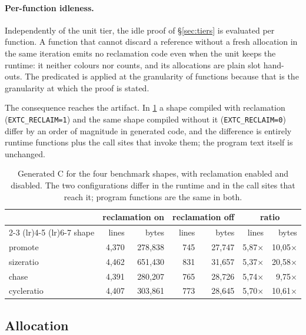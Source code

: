 \paragraph{Per-function idleness.}
Independently of the unit tier, the idle proof of \S\ref{sec:tiers} is evaluated per function.
A function that cannot discard a reference without a fresh allocation in the same iteration
emits no reclamation code even when the unit keeps the runtime: it neither colours nor counts,
and its allocations are plain slot hand-outs.  The predicated is applied at the granularity of
functions because that is the granularity at which the proof is stated.

The consequence reaches the artifact.  In \tab\ref{tab:codesize} a shape compiled with
reclamation (\texttt{EXTC\_RECLAIM=1}) and the same shape compiled without it (\texttt{EXTC\_RECLAIM=0})
differ by an order of magnitude in generated code, and the difference is entirely runtime
functions plus the call sites that invoke them; the program text itself is unchanged.

\begin{table}[t]
\centering
\small
\caption{Generated C for the four benchmark shapes, with reclamation enabled and disabled.
The two configurations differ in the runtime and in the call sites that reach it; program
functions are the same in both.}
\label{tab:codesize}
\begin{tabular}{@{}lrrrrrr@{}}
\toprule
& \multicolumn{2}{c}{reclamation on} & \multicolumn{2}{c}{reclamation off} &
\multicolumn{2}{c}{ratio} \\
\cmidrule(lr){2-3} \cmidrule(lr){4-5} \cmidrule(lr){6-7}
shape & lines & bytes & lines & bytes & lines & bytes \\
\midrule
promote    & 4{,}370 & 278{,}838 & 745 & 27{,}747 & 5{,}87$\times$ & 10{,}05$\times$ \\
sizeratio  & 4{,}462 & 651{,}430 & 831 & 31{,}657 & 5{,}37$\times$ & 20{,}58$\times$ \\
chase      & 4{,}391 & 280{,}207 & 765 & 28{,}726 & 5{,}74$\times$ & 9{,}75$\times$ \\
cycleratio & 4{,}407 & 303{,}861 & 773 & 28{,}645 & 5{,}70$\times$ & 10{,}61$\times$ \\
\bottomrule
\end{tabular}
\end{table}

\subsection{Allocation}
\label{sec:impl-alloc}

